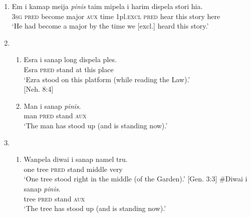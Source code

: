 {\begin{enumerate}
\item 
\gll  Em  i  kamap  meija  \textit{pinis}  taim  mipela  i  harim  dispela  stori  hia.\\
\textsc{3sg}  \textsc{pred}  become  major  \textsc{aux}  time  1pl.\textsc{excl}  \textsc{pred}  hear  this  story  here\\
\glt ‘He had become a major by the time we [excl.] heard this story.’  

\item
\begin{enumerate}[label=\alph*.]
\item
\gll  Esra  i  sanap  long  dispela  ples.\\
Esra  \textsc{pred}  stand  at  this  place\\
\glt ‘Ezra stood on this platform (while reading the Law).’ \\ \hfill  [Neh. 8:4]
\item
 \gll  Man  i  sanap  \textit{pinis}.\\
man  \textsc{pred}  stand  \textsc{aux}\\
\glt ‘The man has stood up (and is standing now).’  
\end{enumerate}

\item
\begin{enumerate}[label=\alph*.]
\item
\gll Wanpela  diwai  i  sanap  namel  tru.\\
one  tree  \textsc{pred}  stand  middle  very\\
\glt ‘One tree stood right in the middle (of the Garden).’  [Gen. 3:3]
\ex \gll  \#Diwai  i  sanap  \textit{pinis}.\\
    tree  \textsc{pred}  stand  \textsc{aux}\\
\glt ‘The tree has stood up (and is standing now).’  
\end{enumerate}
\end{enumerate}
}
 